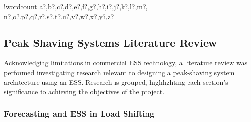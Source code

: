 \documentclass[10pt]{article}
\newcounter{words}
\newenvironment{counted}{%
  \setcounter{words}{0}
  \SearchList!{wordcount}{\stepcounter{words}}
    {a?,b?,c?,d?,e?,f?,g?,h?,i?,j?,k?,l?,m?,
    n?,o?,p?,q?,r?,s?,t?,u?,v?,w?,x?,y?,z?}
  \UndoBoundary{'}
  \SearchOrder{p;}}{%
  \StopSearching}
\begin{document}
\begin{counted}
\subsection{Peak Shaving Systems Literature
Review}\label{peak-shaving-systems-literature-review}

Acknowledging limitations in commercial ESS technology, a literature
review was performed investigating research relevant to designing a
peak-shaving system architecture using an ESS. Research is grouped,
highlighting each section's significance to achieving the objectives of
the project.

\subsubsection{Forecasting and ESS in Load
Shifting}\label{forecasting-and-ess-in-load-shifting}


\end{counted}
\end{document}
